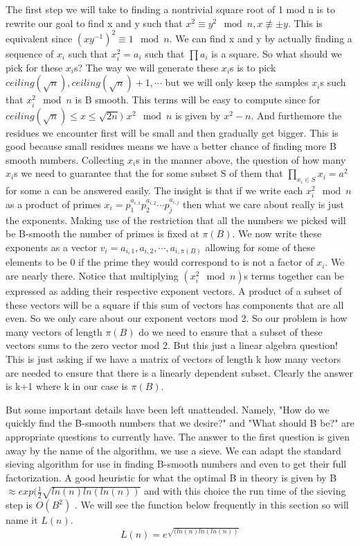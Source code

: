 \documentclass{article}
\begin{document}
The first step we will take to finding a nontrivial square root of 1 mod n is to rewrite our goal to find x and y such that $x^2 \equiv y^2 \mod n, x \not \equiv \pm y$. This is equivalent since $(xy^{-1})^2 \equiv 1 \mod n$.  We can find x and y by actually finding a sequence of $x_i$ such that $x_i^2 = a_i$ such that $\prod a_i $ is a square. So what should we pick for these $x_i$s? The way we will generate these $x_i$s is to pick $ceiling( \sqrt{n}), ceiling(\sqrt{n}) + 1, \cdots$ but we will only keep the samples $x_i$s such that $x_i^2 \mod n$ is B smooth. This terms will be easy to compute since for $ceiling(\sqrt{n}) \leq x \leq \sqrt{2n})$ $x^2 \mod n$ is given by $x^2 - n$. And furthemore the residues we encounter first will be small and then gradually get bigger. This is good because small residues means we have a better chance of finding more B smooth numbers.  Collecting $x_i$s in the manner above,  the question of how many $x_i$s we need to guarantee that the for some subset S of them that $\prod_{x_i \in S} x_i = a^2$ for some a can be answered easily. The insight is that if we write each $x_i^2 \mod n$ as a product of primes $x_i = p_1^{a_{i,1}} p_2^{a_{i,2}} \cdots p_j^{a_{i,j}}$ then what we care about really is just the exponents. Making use of the restriction that all the numbers we picked will be B-smooth the number of primes is fixed at $\pi (B)$. We now write these exponents as a vector $v_i = a_{i,1}, a_{i,2}, \cdots, a_{i, \pi (B)}$ allowing for some of these elements to be 0 if the prime they would correspond to is not a factor of $x_i$. We are nearly there. Notice that multiplying $(x_i^2 \mod n)$s terms together can be expressed as adding their respective exponent vectors. A product of a subset of these vectors will be a square if this sum of vectors has components that are all even. So we only care about our exponent vectors mod 2. So our problem is how many vectors of length $\pi (B)$ do we need to ensure that a subset of these vectors sums to the zero vector mod 2. But this just a linear algebra question! This is just asking if we have a matrix of vectors of length k how many vectors are needed to ensure that there is a linearly dependent subset. Clearly the answer is k+1 where k in our case is $\pi(B)$. 

But some important details have been left unattended. Namely, "How do we quickly find the B-smooth numbers that we desire?" and "What should B be?" are appropriate questions to currently have.  The answer to the first question is given away by the name of the algorithm, we use a sieve. We can adapt the standard sieving algorithm for use in finding B-smooth numbers and even to get their full factorization. A good heuristic for what the optimal B in theory is given by B $\approx exp( \frac{1}{2} \sqrt{ln ( n) ln ( ln ( n ) )}$ and with this choice the run time of the sieving step is $O(B^2)$ \cite{crandall2006prime}.   We will see the function below frequently in this section so will name it $L(n)$. 
\begin{equation}
    L(n) = e^{\sqrt{(ln ( n ) ln ( ln ( n) )}}
\end{equation}
\end{document}
